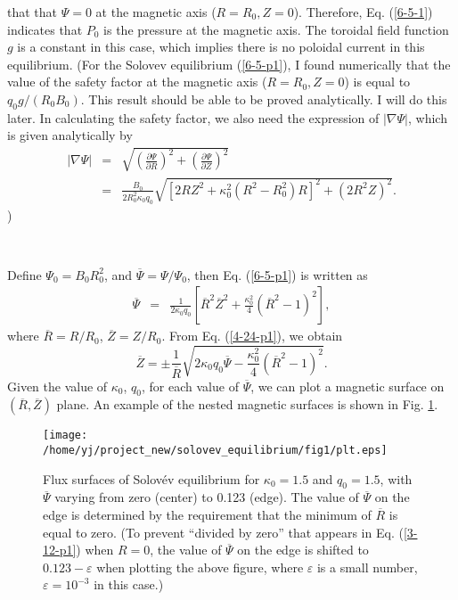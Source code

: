 \documentclass{article}
\begin{document}
that that $\Psi = 0$ at the magnetic axis ($R = R_0, Z = 0$). Therefore, Eq.
(\ref{6-5-1}) indicates that $P_0$ is the pressure at the magnetic axis. The
toroidal field function $g$ is a constant in this case, which implies there is
no poloidal current in this equilibrium. (For the Solovev equilibrium
(\ref{6-5-p1}), I found numerically that the value of the safety factor at the
magnetic axis ($R = R_0, Z = 0$) is equal to $q_0 g / (R_0 B_0)$. This result
should be able to be proved analytically. I will do this later. In calculating
the safety factor, we also need the expression of $| \nabla \Psi |$, which is
given analytically by
\begin{eqnarray}
  | \nabla \Psi | & = & \sqrt{\left( \frac{\partial \Psi}{\partial R}
  \right)^2 + \left( \frac{\partial \Psi}{\partial Z} \right)^2} \nonumber\\
  & = & \frac{B_0}{2 R_0^2 \kappa_0 q_0} \sqrt{[2 R Z^2 + \kappa_0^2 (R^2 -
  R_0^2) R]^2 + (2 R^2 Z)^2} . 
\end{eqnarray}
)

\

Define $\Psi_0 = B_0 R_0^2$, and $\overline{\Psi} = \Psi / \Psi_0$, then Eq.
(\ref{6-5-p1}) is written as
\begin{eqnarray}
  \overline{\Psi} & = & \frac{1}{2 \kappa_0 q_0} \left[ \overline{R}^2
  \overline{Z}^2 + \frac{\kappa_0^2}{4} (\overline{R}^2 - 1)^2 \right], 
  \label{4-24-p1}
\end{eqnarray}
where $\overline{R} = R / R_0$, $\overline{Z} = Z / R_0$. From Eq.
(\ref{4-24-p1}), we obtain
\begin{equation}
  \label{3-12-p1} \overline{Z} = \pm \frac{1}{\overline{R}} \sqrt{2 \kappa_0
  q_0 \overline{\Psi} - \frac{\kappa_0^2}{4} (\overline{R}^2 - 1)^2} .
\end{equation}
Given the value of $\kappa_0$, $q_0$, for each value of $\overline{\Psi}$, we
can plot a magnetic surface on $(\overline{R}, \overline{Z})$ plane. An
example of the nested magnetic surfaces is shown in Fig. \ref{4-24-p6}.

\begin{figure}[h]
  \texttt{[image: /home/yj/project\_new/solovev\_equilibrium/fig1/plt.eps]}
  \caption{\label{4-24-p6}Flux surfaces of Solov{\'e}v equilibrium for
  $\kappa_0 = 1.5$ and $q_0 = 1.5$, with $\overline{\Psi}$ varying from zero
  (center) to 0.123 (edge). The value of $\overline{\Psi}$ on the edge is
  determined by the requirement that the minimum of $\overline{R}$ is equal to
  zero. (To prevent ``divided by zero'' that appears in Eq. (\ref{3-12-p1})
  when $R = 0$, the value of $\overline{\Psi}$ on the edge is shifted to
  $0.123 - \varepsilon$ when plotting the above figure, where $\varepsilon$ is
  a small number, $\varepsilon = 10^{- 3}$ in this case.)}
\end{figure}
\end{document}
